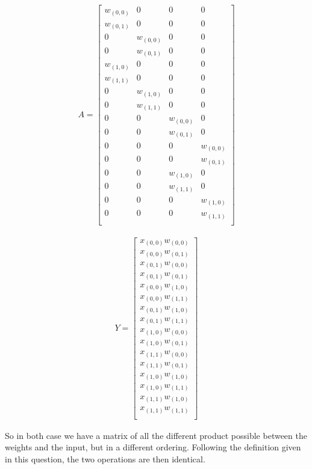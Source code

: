 \begin{align*}
    A =
    \begin{bmatrix}
        w_{(0,0)} & 0 & 0 & 0 \\
        w_{(0,1)} & 0 & 0 & 0 \\
        0 & w_{(0,0)} & 0 & 0 \\
        0 & w_{(0,1)} & 0 & 0 \\
        w_{(1,0)} & 0 & 0 & 0 \\
        w_{(1,1)} & 0 & 0 & 0 \\
        0 & w_{(1,0)} & 0 & 0 \\
        0 & w_{(1,1)} & 0 & 0 \\
        0 & 0 & w_{(0,0)} & 0 \\
        0 & 0 & w_{(0,1)} & 0 \\
        0 & 0 & 0 & w_{(0,0)} \\
        0 & 0 & 0 & w_{(0,1)} \\
        0 & 0 & w_{(1,0)} & 0 \\
        0 & 0 & w_{(1,1)} & 0 \\
        0 & 0 & 0 & w_{(1,0)} \\
        0 & 0 & 0 & w_{(1,1)} \\
    \end{bmatrix}
\end{align*}

\begin{align*}
    Y =
    \begin{bmatrix}
        x_{(0,0)} w_{(0,0)} \\
        x_{(0,0)} w_{(0,1)} \\
        x_{(0,1)} w_{(0,0)} \\
        x_{(0,1)} w_{(0,1)} \\
        x_{(0,0)} w_{(1,0)} \\
        x_{(0,0)} w_{(1,1)} \\
        x_{(0,1)} w_{(1,0)} \\
        x_{(0,1)} w_{(1,1)} \\
        x_{(1,0)} w_{(0,0)} \\
        x_{(1,0)} w_{(0,1)} \\
        x_{(1,1)} w_{(0,0)} \\
        x_{(1,1)} w_{(0,1)} \\
        x_{(1,0)} w_{(1,0)} \\
        x_{(1,0)} w_{(1,1)} \\
        x_{(1,1)} w_{(1,0)} \\
        x_{(1,1)} w_{(1,1)} \\
    \end{bmatrix}
\end{align*}

So in both case we have a matrix of all the different product possible between the weights and the input, but in a
different ordering.
Following the definition given in this question, the two operations are then identical.
